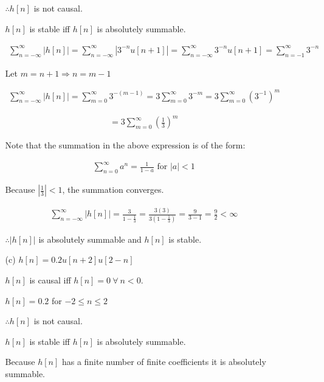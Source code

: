\documentclass[fleqn]{article}
\begin{document}
\begin{enumerate}[nolistsep]
\begin{enumerate}[nolistsep]
					$\therefore h[n]$ is not causal.
					
					$h[n]$ is stable iff $h[n]$ is absolutely summable.
					
					\begin{align*}
						\sum_{n=-\infty}^{\infty}{|h[n]|} = \sum_{n=-\infty}^{\infty}{|3^{-n}u[n+1]|} = \sum_{n=-\infty}^{\infty}{3^{-n}u[n+1]} = \sum_{n=-1}^{\infty}{3^{-n}}
					\end{align*}
					
					Let $m = n + 1 \Rightarrow n = m - 1$
					
					\begin{align*}
						\sum_{n=-\infty}^{\infty}{|h[n]|} = \sum_{m=0}^{\infty}{3^{-(m-1)}} = 3\sum_{m=0}^{\infty}{3^{-m}} = 3\sum_{m=0}^{\infty}{(3^{-1})^{m}}
					\end{align*}
					
					\begin{align*}
						 = 3\sum_{m=0}^{\infty}{\left(\frac{1}{3}\right)^{m}}
					\end{align*}
					
					Note that the summation in the above expression is of the form:
					
					\begin{align*}
						\sum_{n=0}^{\infty}{a^n} = \frac{1}{1-a} \text{ for } |a| < 1 
					\end{align*}
					
					Because $|\frac{1}{3}| < 1$, the summation converges.
					
					\begin{align*}
						\sum_{n=-\infty}^{\infty}{|h[n]|} = \frac{3}{1-\frac{1}{3}} = \frac{3(3)}{3\left(1-\frac{1}{3}\right)} = \frac{9}{3 - 1} = \frac{9}{2} < \infty
					\end{align*}
					
					$\therefore |h[n]|$ is absolutely summable and $h[n]$ is stable.
					
				\item[(c)] $h[n] = 0.2u[n+2]u[2-n]$
				
					$h[n]$ is causal iff $h[n] = 0\ \forall\ n < 0$.
					
					$h[n] = 0.2$ for $-2 \leq n \leq 2$
					
					$\therefore h[n]$ is not causal.
					
					$h[n]$ is stable iff $h[n]$ is absolutely summable.
					
					Because $h[n]$ has a finite number of finite coefficients it is absolutely summable.
					

\end{enumerate}
\end{enumerate}
\end{document}
